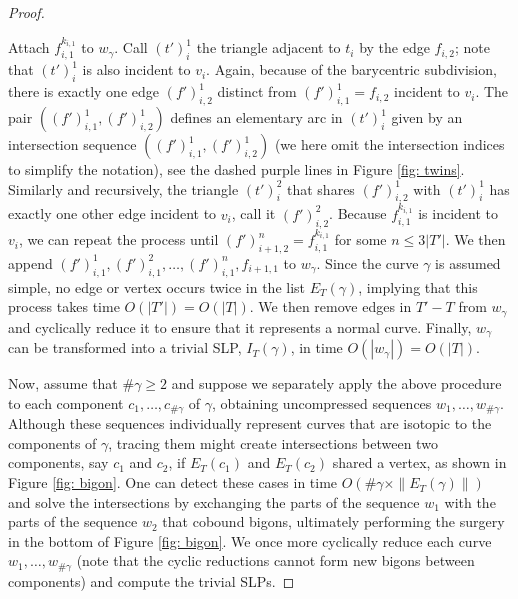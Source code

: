 \documentclass[11pt]{amsart}
\numberwithin{equation}{section}
\theoremstyle{plain}
\theoremstyle{definition}
\begin{document}
\begin{proof}
\begin{figure}[htbp]
    \caption{}
\end{figure}


Attach $f^{k_{i,1}}_{i,1}$ to $w_{\gamma}$. Call $(t')_i^1$ the triangle adjacent to $t_i$ by the edge $f_{i,2}$; note that $(t')_i^1$ is also incident to $v_i$.
Again, because of the barycentric subdivision, there is exactly one edge $(f')_{i,2}^1$ distinct from $(f')_{i,1}^1=f_{i,2}$ incident to $v_i$.
The pair $((f')^1_{i,1}, (f')^1_{i,2})$ defines an elementary arc in $(t')_i^1$ given by an intersection sequence $((f')^1_{i,1}, (f')^1_{i,2})$ (we here omit the intersection indices to simplify the notation), see the dashed purple lines in Figure \ref{fig: twins}. 
Similarly and recursively, the triangle $(t')^2_i$ that shares $(f')^1_{i,2}$ with $(t')^1_i$ has exactly one other edge incident to $v_i$, call it $(f')^2_{i,2}$. 
Because $f^{k_{i,1}}_{i,1}$ is incident to $v_i$, we can repeat the process until $(f')^n_{i+1,2}=f^{k_{i,1}}_{i,1}$ for some $n\leq 3|T'|$.
We then append $(f')^1_{i,1}, (f')^2_{i,1},\dots, (f')^n_{i,1}, f_{i+1,1}$ to $w_\gamma$. 
Since the curve $\gamma$ is assumed simple, no edge or vertex occurs twice in the list $E_T(\gamma)$, implying that this process takes time $O(|T'|)=O(|T|)$. 
We then remove edges in $T'-T$ from $w_\gamma$ and cyclically reduce it to ensure that it represents a normal curve.
Finally, $w_\gamma$ can be transformed into a trivial SLP, $I_T(\gamma)$, in time $O(|w_\gamma|)=O(|T|)$. 

Now, assume that $\#\gamma\geq 2$ and suppose we separately apply the above procedure to each component $c_1,\dots,c_{\#\gamma}$ of $\gamma$, obtaining uncompressed sequences $w_1,\dots,w_{\#\gamma}$.
Although these sequences individually represent curves that are isotopic to the components of $\gamma$, tracing them might create intersections between two components, say $c_1$ and $c_2$, if $E_T(c_1)$ and $E_T(c_2)$ shared a vertex, as shown in Figure \ref{fig: bigon}.
One can detect these cases in time $O(\#\gamma\times \|E_T(\gamma)\|)$ and solve the intersections by exchanging the parts of the sequence $w_1$ with the parts of the sequence $w_2$ that cobound bigons, ultimately performing the surgery in the bottom of Figure \ref{fig: bigon}.
We once more cyclically reduce each curve $w_1,\dots, w_{\#\gamma}$ (note that the cyclic reductions cannot form new bigons between components) and compute the trivial SLPs.
\end{proof}
\end{document}

